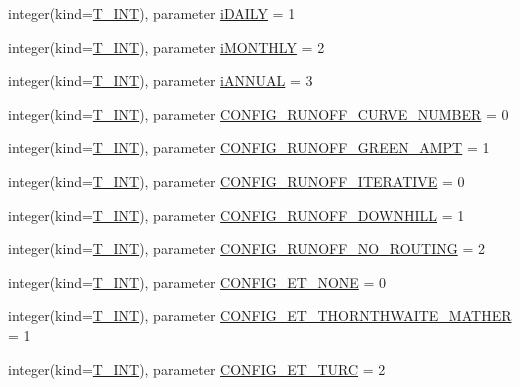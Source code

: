\begin{DoxyCompactItemize}
\item 
integer(kind=\hyperlink{namespacetypes_a4e4d040a4425196c4d43be63e7e6103a}{T\_\-INT}), parameter \hyperlink{namespacetypes_ad8ad58046e9a408cde943dcc94b88167}{iDAILY} = 1
\item 
integer(kind=\hyperlink{namespacetypes_a4e4d040a4425196c4d43be63e7e6103a}{T\_\-INT}), parameter \hyperlink{namespacetypes_ababe8d6bc68f768e3d42595fb178ac05}{iMONTHLY} = 2
\item 
integer(kind=\hyperlink{namespacetypes_a4e4d040a4425196c4d43be63e7e6103a}{T\_\-INT}), parameter \hyperlink{namespacetypes_a6b2dec75398d02bce486b6dd921e1807}{iANNUAL} = 3
\item 
integer(kind=\hyperlink{namespacetypes_a4e4d040a4425196c4d43be63e7e6103a}{T\_\-INT}), parameter \hyperlink{namespacetypes_a13d2dc6a53c0611774f26d83189e45e1}{CONFIG\_\-RUNOFF\_\-CURVE\_\-NUMBER} = 0
\item 
integer(kind=\hyperlink{namespacetypes_a4e4d040a4425196c4d43be63e7e6103a}{T\_\-INT}), parameter \hyperlink{namespacetypes_a95bb0084d2d95f85aaaf43581e2b0c43}{CONFIG\_\-RUNOFF\_\-GREEN\_\-AMPT} = 1
\item 
integer(kind=\hyperlink{namespacetypes_a4e4d040a4425196c4d43be63e7e6103a}{T\_\-INT}), parameter \hyperlink{namespacetypes_a7feb2433c90e8248bbe69792c9b67712}{CONFIG\_\-RUNOFF\_\-ITERATIVE} = 0
\item 
integer(kind=\hyperlink{namespacetypes_a4e4d040a4425196c4d43be63e7e6103a}{T\_\-INT}), parameter \hyperlink{namespacetypes_afd1849eb3a3e616a3da9bee8064421fc}{CONFIG\_\-RUNOFF\_\-DOWNHILL} = 1
\item 
integer(kind=\hyperlink{namespacetypes_a4e4d040a4425196c4d43be63e7e6103a}{T\_\-INT}), parameter \hyperlink{namespacetypes_a322478702adcb70451718ef549d9071b}{CONFIG\_\-RUNOFF\_\-NO\_\-ROUTING} = 2
\item 
integer(kind=\hyperlink{namespacetypes_a4e4d040a4425196c4d43be63e7e6103a}{T\_\-INT}), parameter \hyperlink{namespacetypes_aa00d17553b5924914a0c6101d2a3af21}{CONFIG\_\-ET\_\-NONE} = 0
\item 
integer(kind=\hyperlink{namespacetypes_a4e4d040a4425196c4d43be63e7e6103a}{T\_\-INT}), parameter \hyperlink{namespacetypes_aa1f3f7bad7912d092d9b1a8f726e4f47}{CONFIG\_\-ET\_\-THORNTHWAITE\_\-MATHER} = 1
\item 
integer(kind=\hyperlink{namespacetypes_a4e4d040a4425196c4d43be63e7e6103a}{T\_\-INT}), parameter \hyperlink{namespacetypes_a402a872e6930d08699d8371bd68f0247}{CONFIG\_\-ET\_\-TURC} = 2
\item 

\end{DoxyCompactItemize}
